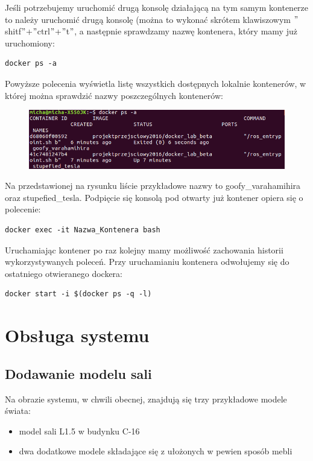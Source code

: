 \documentclass[10pt, a4paper]{article}
\begin{document}
Jeśli potrzebujemy uruchomić drugą konsolę działającą na tym samym kontenerze to należy uruchomić drugą konsolę (można to wykonać skrótem klawiszowym $"$shitf$"$+$"$ctrl$"$+$"$t$"$, a następnie sprawdzamy nazwę kontenera, który mamy już uruchomiony:

 \begin{verbatim}
docker ps -a
\end{verbatim}


Powyższe polecenia wyświetla listę wszystkich dostępnych lokalnie kontenerów, w której można sprawdzić nazwy poszczególnych kontenerów:


\begin{figure}[hbt]
  \setlength{\unitlength}{1.0cm}
  \centering 
  
    \includegraphics[width=12 cm]{./grafika/ps-a.png}

\end{figure}

Na przedstawionej na rysunku liście przykładowe nazwy to goofy\_varahamihira oraz stupefied\_tesla. Podpięcie się konsolą pod otwarty już kontener opiera się o polecenie:


 \begin{verbatim}
docker exec -it Nazwa_Kontenera bash
\end{verbatim}


Uruchamiając kontener po raz kolejny mamy możliwość zachowania historii wykorzystywanych poleceń. Przy uruchamianiu kontenera odwołujemy się do ostatniego otwieranego dockera:
\begin{verbatim}
docker start -i $(docker ps -q -l)
\end{verbatim}



\section{Obsługa systemu}
\subsection{Dodawanie modelu sali}
Na obrazie systemu, w chwili obecnej, znajdują się trzy przykładowe modele świata:
\begin{itemize}
\item model sali L1.5 w budynku C-16
\item dwa dodatkowe modele składające się z ułożonych w pewien sposób mebli 
\end{itemize}
\end{document}

